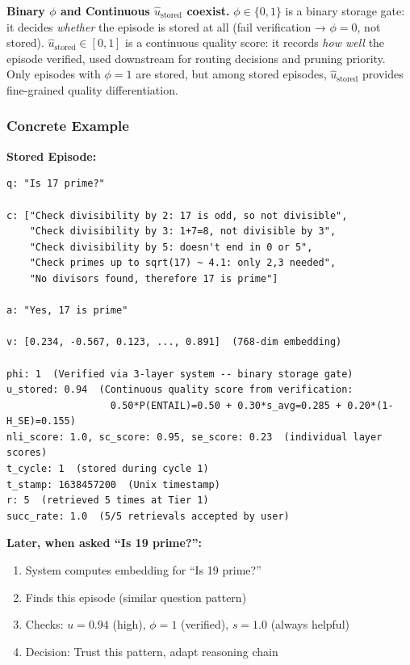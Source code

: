\documentclass[12pt,a4paper]{article}
\theoremstyle{definition}
\newcommand{\ustored}{\hat{u}_{\text{stored}}}
\begin{document}
\begin{keyinsightbox}
\textbf{Binary $\phi$ and Continuous $\ustored$ coexist.} $\phi \in \{0,1\}$ is a binary storage gate: it decides \textit{whether} the episode is stored at all (fail verification → $\phi=0$, not stored). $\ustored \in [0,1]$ is a continuous quality score: it records \textit{how well} the episode verified, used downstream for routing decisions and pruning priority. Only episodes with $\phi=1$ are stored, but among stored episodes, $\ustored$ provides fine-grained quality differentiation.
\end{keyinsightbox}

\subsubsection{Concrete Example}

\begin{examplebox}
\textbf{Stored Episode:}

\begin{verbatim}
q: "Is 17 prime?"

c: ["Check divisibility by 2: 17 is odd, so not divisible",
    "Check divisibility by 3: 1+7=8, not divisible by 3",
    "Check divisibility by 5: doesn't end in 0 or 5",
    "Check primes up to sqrt(17) ~ 4.1: only 2,3 needed",
    "No divisors found, therefore 17 is prime"]

a: "Yes, 17 is prime"

v: [0.234, -0.567, 0.123, ..., 0.891]  (768-dim embedding)

phi: 1  (Verified via 3-layer system -- binary storage gate)
u_stored: 0.94  (Continuous quality score from verification:
                  0.50*P(ENTAIL)=0.50 + 0.30*s_avg=0.285 + 0.20*(1-H_SE)=0.155)
nli_score: 1.0, sc_score: 0.95, se_score: 0.23  (individual layer scores)
t_cycle: 1  (stored during cycle 1)
t_stamp: 1638457200  (Unix timestamp)
r: 5  (retrieved 5 times at Tier 1)
succ_rate: 1.0  (5/5 retrievals accepted by user)
\end{verbatim}

\textbf{Later, when asked ``Is 19 prime?'':}
\begin{enumerate}
    \item System computes embedding for ``Is 19 prime?''
    \item Finds this episode (similar question pattern)
    \item Checks: $u = 0.94$ (high), $\phi = 1$ (verified), $s = 1.0$ (always helpful)
    \item Decision: Trust this pattern, adapt reasoning chain
\end{enumerate}
\end{examplebox}
\end{document}
